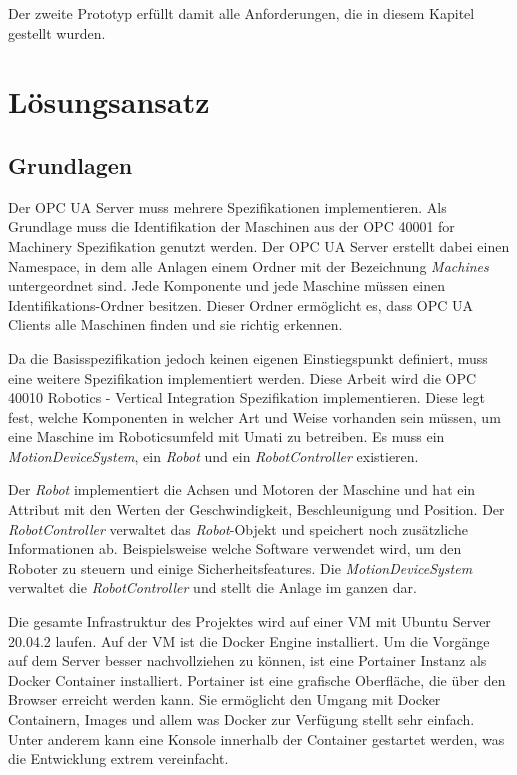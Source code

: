 \documentclass[a4paper, 12pt, oneside, toc=listofnumbered, bibliography=totoc]{scrbook}
\begin{document}
		Der zweite Prototyp erfüllt damit alle Anforderungen, die in diesem Kapitel gestellt wurden.
		
	\section{Lösungsansatz}
	
		\subsection{Grundlagen}
		Der OPC UA Server muss mehrere Spezifikationen implementieren. Als Grundlage muss die Identifikation der Maschinen aus der OPC 40001 for Machinery Spezifikation genutzt werden. Der OPC UA Server erstellt dabei einen Namespace, in dem alle Anlagen einem Ordner mit der Bezeichnung \textit{Machines} untergeordnet sind. Jede Komponente und jede Maschine müssen einen Identifikations-Ordner besitzen. Dieser Ordner ermöglicht es, dass OPC UA Clients alle Maschinen finden und sie richtig erkennen. 
		
		Da die Basisspezifikation jedoch keinen eigenen Einstiegspunkt definiert, muss eine weitere Spezifikation implementiert werden. Diese Arbeit wird die OPC 40010 Robotics - Vertical Integration Spezifikation implementieren. Diese legt fest, welche Komponenten in welcher Art und Weise vorhanden sein müssen, um eine Maschine im Roboticsumfeld mit Umati zu betreiben. Es muss ein \textit{MotionDeviceSystem}, ein \textit{Robot} und ein \textit{RobotController} existieren. 
		
		Der \textit{Robot} implementiert die Achsen und Motoren der Maschine und hat ein Attribut mit den Werten der Geschwindigkeit, Beschleunigung und Position. Der \textit{RobotController} verwaltet das \textit{Robot}-Objekt und speichert noch zusätzliche Informationen ab. Beispielsweise welche Software verwendet wird, um den Roboter zu steuern und einige Sicherheitsfeatures. Die \textit{MotionDeviceSystem} verwaltet die \textit{RobotController} und stellt die Anlage im ganzen dar.
		
		Die gesamte Infrastruktur des Projektes wird auf einer VM mit Ubuntu Server 20.04.2 laufen. Auf der VM ist die Docker Engine installiert. Um die Vorgänge auf dem Server besser nachvollziehen zu können, ist eine Portainer Instanz als Docker Container installiert. Portainer ist eine grafische Oberfläche, die über den Browser erreicht werden kann. Sie ermöglicht den Umgang mit Docker Containern, Images und allem was Docker zur Verfügung stellt sehr einfach. Unter anderem kann eine Konsole innerhalb der Container gestartet werden, was die Entwicklung extrem vereinfacht. 
		
\end{document}
